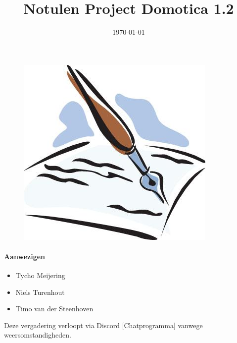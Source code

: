 \documentclass[11pt]{article}
\title{Notulen Project Domotica 1.2}
\date{\today} %
\begin{document}
\thispagestyle{empty}
\maketitle %
\begin{figure}[h]
	\includegraphics[width=\textwidth]{notulen}

\end{figure}
\newpage
\paragraph{Aanwezigen}

\begin{itemize}
	\item Tycho Meijering
	\item Niels Turenhout
	\item Timo van der Steenhoven
\end{itemize}
Deze vergadering verloopt via Discord [Chatprogramma] vanwege
weersomstandigheden.
\end{document}
